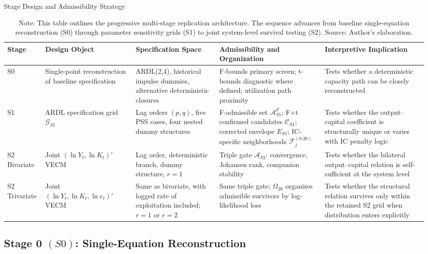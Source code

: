 \documentclass[11pt]{article}
\begin{document}
\begin{table}[h!]
\centering
\scriptsize
\caption{Stage Design and Admissibility Strategy}
\label{tab:cross_stage_synthesis}
\begin{tabular}{@{}>{\raggedright\arraybackslash}p{1.6cm}>{\raggedright\arraybackslash}p{2.6cm}>{\raggedright\arraybackslash}p{3.0cm}>{\raggedright\arraybackslash}p{3.2cm}>{\raggedright\arraybackslash}p{3.2cm}@{}}
\toprule
Stage & Design Object & Specification Space & Admissibility and Organization & Interpretive Implication \\
\midrule
\midrule
S0 & Single-point reconstruction of baseline specification & ARDL(2,4), historical impulse dummies, alternative deterministic closures & F-bounds primary screen; t-bounds diagnostic where defined; utilization path proximity & Tests whether a deterministic capacity path can be closely reconstructed \\
S1 & ARDL specification grid $\mathcal{G}_{S1}$ & Lag orders $(p,q)$, five PSS cases, four nested dummy structures & F-admissible set $\mathcal{A}^{F}_{S1}$; F+t confirmed candidates $\mathcal{C}_{S1}$; corrected envelope $E_{S1}$; IC-specific neighborhoods $\mathcal{F}^{(0.20)}_j$ & Tests whether the output--capital coefficient is structurally unique or varies with IC penalty logic \\
S2 Bivariate & Joint $(\ln Y_t, \ln K_t)'$ VECM & Lag order, deterministic branch, dummy structure, $r=1$ & Triple gate $\mathcal{A}_{S2}$: convergence, Johansen rank, companion stability & Tests whether the bilateral output--capital relation is self-sufficient at the system level \\
S2 Trivariate & Joint $(\ln Y_t, \ln K_t, \ln e_t)'$ VECM & Same as bivariate, with logged rate of exploitation included; $r=1$ or $r=2$ & Same triple gate; $\Omega_{20}$ organizes admissible survivors by log-likelihood loss & Tests whether the structural relation survives only within the retained S2 grid when distribution enters explicitly \\
\bottomrule
\end{tabular}
\caption*{Note: This table outlines the progressive multi-stage replication architecture. The sequence advances from baseline single-equation reconstruction (S0) through parameter sensitivity grids (S1) to joint system-level survival testing (S2). Source: Author's elaboration.}
\end{table}

\subsection{Stage 0 \texorpdfstring{$(S0)$}{}: Single-Equation Reconstruction}
\label{subsec:S0_reconstruction}
\end{document}
